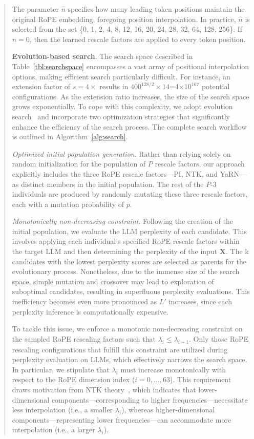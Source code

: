 \begin{abstract}
The parameter $\hat{n}$ specifies how many leading token positions maintain the original RoPE embedding, foregoing position interpolation. In practice, $\hat{n}$ is selected from the set \{0, 1, 2, 4, 8, 12, 16, 20, 24, 28, 32, 64, 128, 256\}. If $\hat{n}=0$, then the learned rescale factors are applied to every token position.

\textbf{Evolution-based search}. The search space described in Table~\ref{tbl:searchspace} encompasses a vast array of positional interpolation options, making efficient search particularly difficult. For instance, an extension factor of $s=4\times$ results in $400^{128/2}\times14$=4$\times10^{167}$ potential configurations. As the extension ratio increases, the size of the search space grows exponentially. To cope with this complexity, we adopt evolution search~\cite{guo2020single} and incorporate two optimization strategies that significantly enhance the efficiency of the search process. The complete search workflow is outlined in Algorithm~\ref{alg:search}.

\textit{Optimized initial population generation}. Rather than relying solely on random initialization for the population of $P$ rescale factors, our approach explicitly includes the three RoPE rescale factors—PI, NTK, and YaRN—as distinct members in the initial population. The rest of the $P$-3 individuals are produced by randomly mutating these three rescale factors, each with a mutation probability of $p$.

\textit{Monotonically non-decreasing constraint}. Following the creation of the initial population, we evaluate the LLM perplexity of each candidate. This involves applying each individual’s specified RoPE rescale factors within the target LLM and then determining the perplexity of the input $\mathbf{X}$. The k candidates with the lowest perplexity scores are selected as parents for the evolutionary process. Nonetheless, due to the immense size of the search space, simple mutation and crossover may lead to exploration of suboptimal candidates, resulting in superfluous perplexity evaluations. This inefficiency becomes even more pronounced as $L'$ increases, since each perplexity inference is computationally expensive.

To tackle this issue, we enforce a monotonic non-decreasing constraint on the sampled RoPE rescaling factors such that $\lambda_i \le \lambda_{i+1}$. Only those RoPE rescaling configurations that fulfill this constraint are utilized during perplexity evaluation on LLMs, which effectively narrows the search space. In particular, we stipulate that $\lambda_i$ must increase monotonically with respect to the RoPE dimension index ($i=0,\ldots,63$). This requirement draws motivation from NTK theory~\cite{jacot2018neural,tancik2020fourier,ntk}, which indicates that lower-dimensional components—corresponding to higher frequencies—necessitate less interpolation (i.e., a smaller $\lambda_i$), whereas higher-dimensional components—representing lower frequencies—can accommodate more interpolation (i.e., a larger $\lambda_i$).


\end{abstract}
